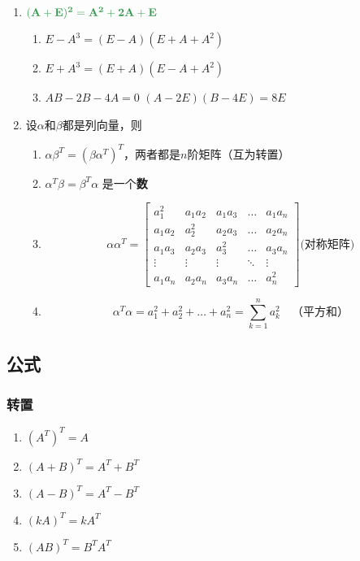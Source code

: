 \documentclass[a4paper,12pt]{article}
\begin{document}
\begin{enumerate}
        \item $\color[rgb]{0.2, 0.6, 0.3}{\mathbf{(A + E)^2 = A^2 + 2A + E}}$
        \begin{enumerate}
            \item $E - A^3 = (E - A)(E + A + A^2)$
            \item $E + A^3 = (E + A)(E - A + A^2)$
            \item $AB - 2B - 4A = 0$ \Leftrightarrow $(A - 2E)(B - 4E) = 8E$
        \end{enumerate}
        \item 设$\alpha$和$\beta$都是列向量，则
        \begin{enumerate}
            \item $\alpha\beta^T = (\beta\alpha^T)^T$，两者都是$n$阶矩阵（互为转置）
            \item $\alpha^T\beta = \beta^T\alpha$ 是一个\textbf{数}
            \item
            \[
                \alpha\alpha^T =
                \begin{bmatrix}
                    a_1^2   & a_1 a_2 & a_1 a_3 & \dots  & a_1 a_n \\
                    a_1 a_2 & a_2^2   & a_2 a_3 & \dots  & a_2 a_n \\
                    a_1 a_3 & a_2 a_3 & a_3^2   & \dots  & a_3 a_n \\
                    \vdots  & \vdots  & \vdots  & \ddots & \vdots  \\
                    a_1 a_n & a_2 a_n & a_3 a_n & \dots  & a_n^2
                \end{bmatrix} \text{(对称矩阵)}
            \]
            \item
            \[
                \alpha^T \alpha = a_1^2 + a_2^2 + \dots + a_n^2 = \sum_{k=1}^{n} a_k^2 \quad \text{（平方和）}
            \]
        \end{enumerate}
    \end{enumerate}

    \subsection{公式}

    \subsubsection{转置}

    \begin{enumerate}
        \item $(A^T)^T = A$
        \item $(A + B)^T = A^T + B^T$
        \item $(A - B)^T = A^T - B^T$
        \item $(kA)^T = kA^T$
        \item $(AB)^T = B^{T}A^T $
    \end{enumerate}
\end{document}
